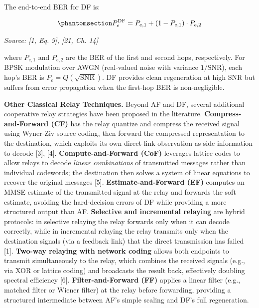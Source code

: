 The end-to-end BER for DF is:

\begin{equation}\protect\phantomsection\label{eq:df-ber-hops}{P_e^{\text{DF}} = P_{e,1} + (1 - P_{e,1}) \cdot P_{e,2}
}\end{equation} \par{\small\textit{Source: [1, Eq. 9], [21, Ch. 14]}}

where \(P_{e,1}\) and \(P_{e,2}\) are the BER of the first and second hops, respectively. For BPSK modulation over AWGN (real-valued noise with variance \(1/\text{SNR}\)), each hop's BER is \(P_e = Q\left(\sqrt{\text{SNR}}\right)\). DF provides clean regeneration at high SNR but suffers from error propagation when the first-hop BER is non-negligible.

\textbf{Other Classical Relay Techniques.} Beyond AF and DF, several additional cooperative relay strategies have been proposed in the literature. \textbf{Compress-and-Forward (CF)} has the relay quantize and compress the received signal using Wyner-Ziv source coding, then forward the compressed representation to the destination, which exploits its own direct-link observation as side information to decode {[}3{]}, {[}4{]}. \textbf{Compute-and-Forward (CoF)} leverages lattice codes to allow relays to decode \emph{linear combinations} of transmitted messages rather than individual codewords; the destination then solves a system of linear equations to recover the original messages {[}5{]}. \textbf{Estimate-and-Forward (EF)} computes an MMSE estimate of the transmitted signal at the relay and forwards the soft estimate, avoiding the hard-decision errors of DF while providing a more structured output than AF. \textbf{Selective and incremental relaying} are hybrid protocols: in selective relaying the relay forwards only when it can decode correctly, while in incremental relaying the relay transmits only when the destination signals (via a feedback link) that the direct transmission has failed {[}1{]}. \textbf{Two-way relaying with network coding} allows both endpoints to transmit simultaneously to the relay, which combines the received signals (e.g., via XOR or lattice coding) and broadcasts the result back, effectively doubling spectral efficiency {[}6{]}. \textbf{Filter-and-Forward (FF)} applies a linear filter (e.g., matched filter or Wiener filter) at the relay before forwarding, providing a structured intermediate between AF's simple scaling and DF's full regeneration.

